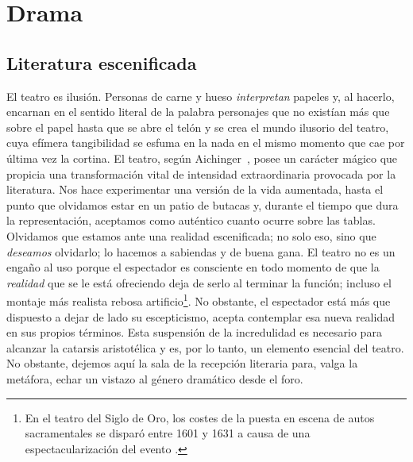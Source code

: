 \chapter{Drama}

\section{Literatura escenificada}
El teatro es ilusión. Personas de carne y hueso \textit{interpretan} papeles y, al hacerlo, encarnan \textemdash en el sentido literal de la palabra\textemdash{} personajes que no existían más que sobre el papel hasta que se abre el telón y se crea el mundo ilusorio del teatro, cuya efímera tangibilidad se esfuma en la nada en el mismo momento que cae por última vez la cortina. El teatro, según Aichinger~\parencite*[99-100]{aichinger2013b}, posee un carácter mágico que propicia una transformación vital de intensidad extraordinaria provocada por la literatura. Nos hace experimentar una versión de la vida aumentada, hasta el punto que olvidamos estar en un patio de butacas y, durante el tiempo que dura la representación, aceptamos como auténtico cuanto ocurre sobre las tablas. Olvidamos que estamos ante una realidad escenificada; no solo eso, sino que \textit{deseamos} olvidarlo; lo hacemos a sabiendas y de buena gana. El teatro no es un engaño al uso porque el espectador es consciente en todo momento de que la \textit{realidad} que se le está ofreciendo deja de serlo al terminar la función; incluso el montaje más realista rebosa artificio\footnote{En el teatro del {S}iglo de {O}ro, los costes de la puesta en escena de autos sacramentales se disparó entre 1601 y 1631 a causa de una espectacularización del evento \parencite[201]{ehrlicher2008}.}. No obstante, el espectador está más que dispuesto a dejar de lado su escepticismo, acepta contemplar esa nueva realidad en sus propios términos. Esta suspensión de la incredulidad es necesario para alcanzar la catarsis aristotélica y es, por lo tanto, un elemento esencial del teatro. No obstante, dejemos aquí la sala de la recepción literaria para, valga la metáfora, echar un vistazo al género dramático desde el foro.

